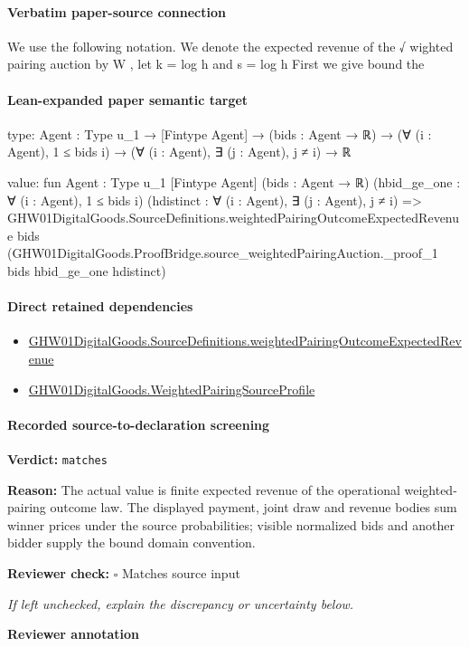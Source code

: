 \documentclass[10pt]{article}
\newcommand{\reviewerbox}{%
  \par\noindent\fbox{\parbox{0.96\linewidth}{\rule{0pt}{0.38in}}}\par
}
\newcommand{\reviewmatch}[1]{%
  \par\noindent\textbf{Reviewer check:} $\square$\; #1\par
  \noindent\emph{If left unchecked, explain the discrepancy or uncertainty below.}\par
}
\begin{document}
\paragraph{Verbatim paper-source connection}
\begin{ReviewVerbatim}
We use the following notation. We denote the expected revenue of the √
wighted pairing auction by W ,
let k = log h and s = log h First we give bound the
\end{ReviewVerbatim}



\paragraph{Lean-expanded paper semantic target}
\begin{ReviewVerbatim}
type:
{Agent : Type u_1} →
  [Fintype Agent] → (bids : Agent → ℝ) → (∀ (i : Agent), 1 ≤ bids i) → (∀ (i : Agent), ∃ (j : Agent), j ≠ i) → ℝ

value:
fun {Agent : Type u_1} [Fintype Agent] (bids : Agent → ℝ) (hbid_ge_one : ∀ (i : Agent), 1 ≤ bids i)
    (hdistinct : ∀ (i : Agent), ∃ (j : Agent), j ≠ i) =>
  GHW01DigitalGoods.SourceDefinitions.weightedPairingOutcomeExpectedRevenue bids
    (GHW01DigitalGoods.ProofBridge.source_weightedPairingAuction._proof_1 bids hbid_ge_one hdistinct)
\end{ReviewVerbatim}

\paragraph{Direct retained dependencies}
\begin{itemize}\raggedright
\item \hyperlink{paper-prerequisite-11769b7a8f4d665e}{GHW01\allowbreak{}Digital\allowbreak{}Goods.\allowbreak{}Source\allowbreak{}Definitions.\allowbreak{}weighted\allowbreak{}Pairing\allowbreak{}Outcome\allowbreak{}Expected\allowbreak{}Revenue}
\item \hyperlink{governing-declaration-d373f24ce2124d1c}{GHW01\allowbreak{}Digital\allowbreak{}Goods.\allowbreak{}Weighted\allowbreak{}Pairing\allowbreak{}Source\allowbreak{}Profile}
\end{itemize}
\paragraph{Recorded source-to-declaration screening}
\textbf{Verdict:} \texttt{matches}
\\
{\raggedright
\textbf{Reason:} The actual value is finite expected revenue of the operational weighted-\allowbreak{}pairing outcome law.\allowbreak{} The displayed payment, joint draw and revenue bodies sum winner prices under the source probabilities;\allowbreak{} visible normalized bids and another bidder supply the bound domain convention.\allowbreak{}
\par}
\reviewmatch{Matches source input}
\noindent\textbf{Reviewer annotation}\par
\reviewerbox
\clearpage
\hypertarget{paper-prerequisite-c71e64dfa99cbe75}{}
\end{document}

